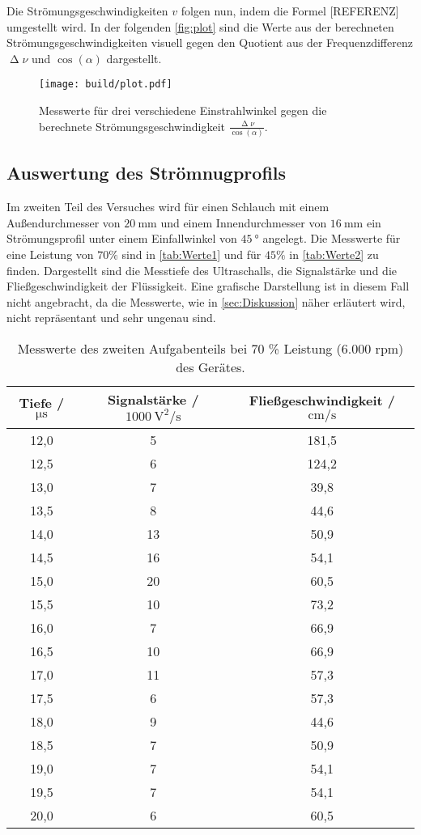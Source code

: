 \noindent
Die Strömungsgeschwindigkeiten $v$ folgen nun, indem die Formel [REFERENZ] umgestellt wird. In der folgenden \autoref{fig:plot} sind die Werte aus der 
berechneten Strömungsgeschwindigkeiten visuell gegen den Quotient aus der Frequenzdifferenz $\upDelta \nu$ und $\cos(\alpha)$ dargestellt.
\begin{figure}[H]
  \centering
  \texttt{[image: build/plot.pdf]}
  \caption{Messwerte für drei verschiedene Einstrahlwinkel gegen die berechnete Strömungsgeschwindigkeit $\frac{\upDelta\nu}{\cos(\alpha)}$.}
  \label{fig:plot}
\end{figure}

\subsection{Auswertung des Strömnugprofils}
\label{subsec:StroemiProf}
Im zweiten Teil des Versuches wird für einen Schlauch mit einem Außendurchmesser von $\SI{20}{\milli\meter}$ und einem Innendurchmesser von $\SI{16}{\milli\metre}$ ein
Strömungsprofil unter einem Einfallwinkel von $\SI{45}{\degree}$ angelegt. Die Messwerte für eine Leistung von $70\%$ sind in \autoref{tab:Werte1} und für $45\%$ in 
\autoref{tab:Werte2} zu finden. Dargestellt sind die Messtiefe des Ultraschalls, die Signalstärke und die Fließgeschwindigkeit der Flüssigkeit.
Eine grafische Darstellung ist in diesem Fall nicht angebracht, da die Messwerte, wie in \autoref{sec:Diskussion} näher erläutert wird, nicht repräsentant und sehr ungenau sind.
\begin{table}[H]
  \centering
  \caption{Messwerte des zweiten Aufgabenteils bei 70 \% Leistung (6.000 rpm) des Gerätes.}
  \label{tab:Werte1}
  \begin{tabular}{c c c}
    \toprule
    Tiefe / $\si{\micro\second}$ & Signalstärke / $\SI{1000}{\square\volt\per\second}$ & Fließgeschwindigkeit / $\si{\centi\meter\per\second}$ \\
    \midrule
    12,0 & 5 & 181,5 \\
    12,5 & 6 & 124,2 \\
    13,0 & 7 & 39,8 \\
    13,5 & 8 & 44,6 \\
    14,0 & 13 & 50,9 \\
    14,5 & 16 & 54,1 \\
    15,0 & 20  & 60,5 \\
    15,5 & 10 & 73,2 \\
    16,0 & 7 & 66,9 \\
    16,5 & 10 & 66,9 \\
    17,0 & 11 & 57,3 \\
    17,5 & 6 & 57,3 \\
    18,0 & 9 & 44,6 \\
    18,5 & 7 & 50,9 \\
    19,0 & 7 & 54,1 \\
    19,5 & 7 & 54,1 \\
    20,0 & 6 & 60,5 \\
    \bottomrule
  \end{tabular}
\end{table}

